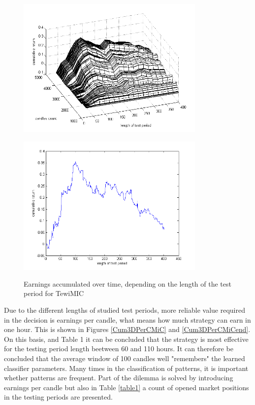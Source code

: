 \documentclass{tewiart}
\begin{document}
\begin{figure}[h!]
\begin{minipage}{.49\linewidth}
\begin{center}
\includegraphics[width=0.82\textwidth]{pictures/cumulativeReturnsC.png}
\label{Cum3DMiC}
\end{center}
\end{minipage}
\begin{minipage}{.49\linewidth}
\begin{center}
\includegraphics[width=0.82\textwidth]{pictures/mic_end.png}
\label{Cum3DMiCend}
\end{center}
\end{minipage}
\caption{Earnings accumulated over time, depending on the length of the test period for TewiMIC}
\end{figure}
\FloatBarrier

Due to the different lengths of studied test periods, more reliable value required in the decision is earnings per candle, what means how much strategy can earn in one hour. This is shown in Figures \ref{Cum3DPerCMiC} and \ref{Cum3DPerCMiCend}. On this basis, and Table 1 it can be concluded that the strategy is most effective for the testing period length beetween 60 and 110 hours. It can therefore be concluded that the average window of 100 candles well "remembers" the learned classifier parameters. Many times in the classification of patterns, it is important whether patterns are frequent. Part of the dilemma is solved by introducing earnings per candle but also in Table \ref{table1} a count of opened market positions in the testing periods are presented.\\
\end{document}
